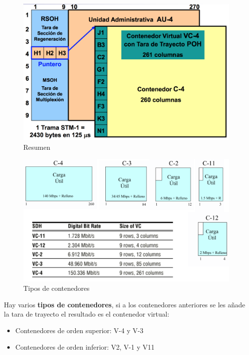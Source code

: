 \documentclass[10pt,portrait, twocolumn]{article}
\begin{document}
	\begin{figure}[!ht]
 		\centering
  		 \includegraphics[scale = 0.4]{images/Resumen}
		\caption{Resumen}
	\end{figure}
	
	\begin{figure}[!ht]
 		\centering
  		 \includegraphics[scale = 0.4]{images/Contenedores}
		\caption{Tipos de contenedores}
	\end{figure}

Hay varios \textbf{tipos de contenedores}, si a los contenedores anteriores se les añade la tara de trayecto el resultado es el contenedor virtual:

	\begin{itemize}
		\item Contenedores de orden superior: V-4 y V-3
		\item Contenedores de orden inferior: V2, V-1 y V11
	\end{itemize}
\end{document}
